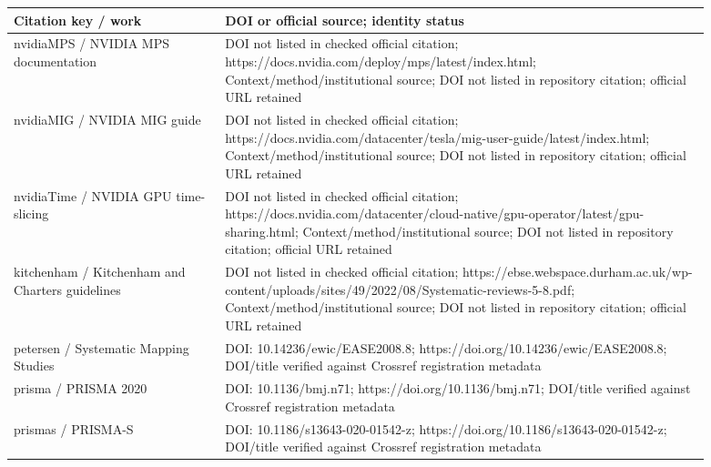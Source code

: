 \documentclass[12pt,a4paper]{article}
\begin{document}
\begin{longtable}{p{0.27\linewidth}p{0.62\linewidth}}
\toprule
Citation key /\allowbreak{} work & DOI or official source; identity status\\\midrule
\endhead
nvidiaMPS /\allowbreak{} NVIDIA MPS documentation & DOI not listed in checked official citation; https:/\allowbreak{}/\allowbreak{}docs.nvidia.com/\allowbreak{}deploy/\allowbreak{}mps/\allowbreak{}latest/\allowbreak{}index.html; Context/\allowbreak{}method/\allowbreak{}institutional source; DOI not listed in repository citation; official URL retained\\
nvidiaMIG /\allowbreak{} NVIDIA MIG guide & DOI not listed in checked official citation; https:/\allowbreak{}/\allowbreak{}docs.nvidia.com/\allowbreak{}datacenter/\allowbreak{}tesla/\allowbreak{}mig-user-guide/\allowbreak{}latest/\allowbreak{}index.html; Context/\allowbreak{}method/\allowbreak{}institutional source; DOI not listed in repository citation; official URL retained\\
nvidiaTime /\allowbreak{} NVIDIA GPU time-slicing & DOI not listed in checked official citation; https:/\allowbreak{}/\allowbreak{}docs.nvidia.com/\allowbreak{}datacenter/\allowbreak{}cloud-native/\allowbreak{}gpu-operator/\allowbreak{}latest/\allowbreak{}gpu-sharing.html; Context/\allowbreak{}method/\allowbreak{}institutional source; DOI not listed in repository citation; official URL retained\\
kitchenham /\allowbreak{} Kitchenham and Charters guidelines & DOI not listed in checked official citation; https:/\allowbreak{}/\allowbreak{}ebse.webspace.durham.ac.uk/\allowbreak{}wp-content/\allowbreak{}uploads/\allowbreak{}sites/\allowbreak{}49/\allowbreak{}2022/\allowbreak{}08/\allowbreak{}Systematic-reviews-5-8.pdf; Context/\allowbreak{}method/\allowbreak{}institutional source; DOI not listed in repository citation; official URL retained\\
petersen /\allowbreak{} Systematic Mapping Studies & DOI: 10.14236/\allowbreak{}ewic/\allowbreak{}EASE2008.8; https:/\allowbreak{}/\allowbreak{}doi.org/\allowbreak{}10.14236/\allowbreak{}ewic/\allowbreak{}EASE2008.8; DOI/\allowbreak{}title verified against Crossref registration metadata\\
prisma /\allowbreak{} PRISMA 2020 & DOI: 10.1136/\allowbreak{}bmj.n71; https:/\allowbreak{}/\allowbreak{}doi.org/\allowbreak{}10.1136/\allowbreak{}bmj.n71; DOI/\allowbreak{}title verified against Crossref registration metadata\\
prismas /\allowbreak{} PRISMA-S & DOI: 10.1186/\allowbreak{}s13643-020-01542-z; https:/\allowbreak{}/\allowbreak{}doi.org/\allowbreak{}10.1186/\allowbreak{}s13643-020-01542-z; DOI/\allowbreak{}title verified against Crossref registration metadata\\

\end{longtable}
\end{document}
